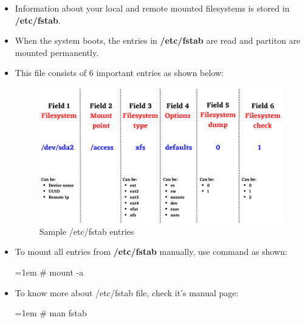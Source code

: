 \setlength{\columnsep}{3pt}
\begin{flushleft}
	
\begin{itemize}
	\item Information about your local and remote mounted filesystems is stored in \textbf{/etc/fstab}.
	\item When the system boots, the entries in \textbf{/etc/fstab} are read and partiton are mounted permanently.
	\item This file consists of 6 important entries as shown below:
	
	\begin{figure}[h!]
		\centering
		\includegraphics[scale=.5]{content/chapter8/images/fstab2.png}
		\caption{Sample /etc/fstab entries}
		\label{fstab}
	\end{figure}	
	
	\item To mount all entries from \textbf{/etc/fstab} manually, use command as shown:
	\bigskip
	\begin{tcolorbox}[breakable,notitle,boxrule=-0pt,colback=black,colframe=black]
		\color{green}
		\font=1em
		\# mount -a
		\font=4pt
	\end{tcolorbox}
	
	\item To know more about /etc/fstab file, check it's manual page:
	\bigskip
	\begin{tcolorbox}[breakable,notitle,boxrule=-0pt,colback=black,colframe=black]
		\color{green}
		\font=1em
		\# man fstab
		\font=4pt
	\end{tcolorbox}
	
\end{itemize}

\newpage

\end{flushleft}
